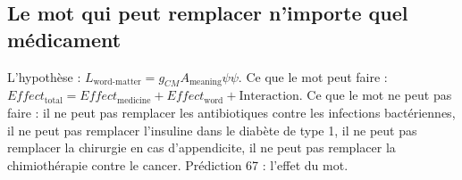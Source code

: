 \subsection{Le mot qui peut remplacer n'importe quel médicament}
L'hypothèse : $L_{\text{word-matter}} = g_{CM} A_{\text{meaning}} \psi \psi$. Ce que le mot peut faire : $Effect_{\text{total}} = Effect_{\text{medicine}} + Effect_{\text{word}} + \text{Interaction}$. Ce que le mot ne peut pas faire : il ne peut pas remplacer les antibiotiques contre les infections bactériennes, il ne peut pas remplacer l'insuline dans le diabète de type 1, il ne peut pas remplacer la chirurgie en cas d'appendicite, il ne peut pas remplacer la chimiothérapie contre le cancer. Prédiction 67 : l'effet du mot.

\newpage
